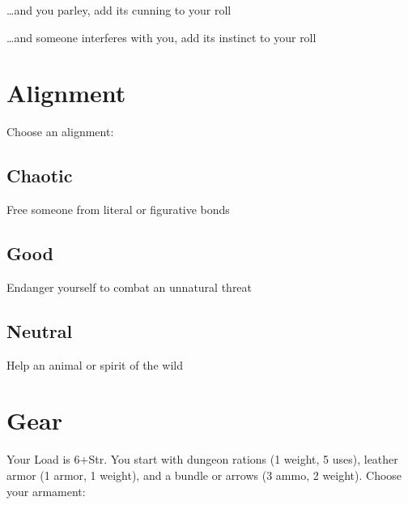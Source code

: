              
\item …and you parley, add its cunning to your roll

             
\item …and someone interferes with you, add its instinct to your roll

           
\stopitemize
         

       

       
\section{Alignment}   
       
\startInstructionsAfterHeader
Choose an alignment:
\stopInstructionsAfterHeader
       

         
\subsection{Chaotic}   
         

Free someone from literal or figurative bonds

         
\subsection{Good}   
         

Endanger yourself to combat an unnatural threat

         
\subsection{Neutral}   
         

Help an animal or spirit of the wild

       

       
\section{Gear}   
       

         

Your Load is 6+Str. You start with dungeon rations (1 weight, 5 uses), leather armor (1 armor, 1 weight), and a bundle or arrows (3 ammo, 2 weight). Choose your armament:

         
\startitemize[1,packed]
           
